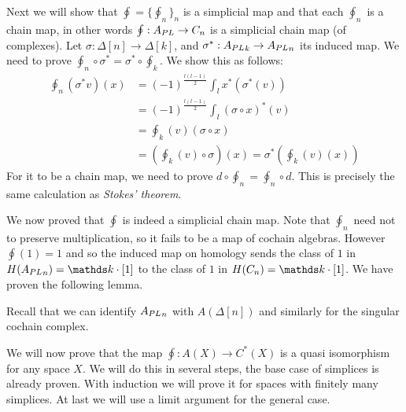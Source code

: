 Next we will show that $\oint = \{\oint_n\}_n$ is a simplicial map and that each $\oint_n$ is a chain map, in other words $\oint : {A_{PL}} \to C_n$ is a simplicial chain map (of complexes). Let $\sigma: \Delta[n] \to \Delta[k]$, and $\sigma^\ast: {A_{PL}}_k \to {A_{PL}}_n$ its induced map. We need to prove $\oint_n \circ \sigma^\ast = \sigma^\ast \circ \oint_k$. We show this as follows:
\begin{align*}
	\oint_n (\sigma^\ast v)(x)
	&= (-1)^\frac{l(l-1)}{2} \int_l x^\ast(\sigma^\ast(v)) \\
	&= (-1)^\frac{l(l-1)}{2} \int_l (\sigma \circ x)^\ast(v) \\
	&= \oint_k (v)(\sigma \circ x) \\
	&= (\oint_k (v) \circ \sigma) (x) = \sigma^\ast (\oint_k(v)(x))
\end{align*}
For it to be a chain map, we need to prove $d \circ \oint_n = \oint_n \circ d$. This is precisely the same calculation as \emph{Stokes' theorem}. 

We now proved that $\oint$ is indeed a simplicial chain map. Note that $\oint_n$ need not to preserve multiplication, so it fails to be a map of cochain algebras. However $\oint(1) = 1$ and so the induced map on homology sends the class of $1$ in $H(\Apl_n) = \k \cdot [1]$ to the class of $1$ in $H(C_n) = \k \cdot [1]$. We have proven the following lemma.


Recall that we can identify ${A_{PL}}_n$ with $A(\Delta[n])$ and similarly for the singular cochain complex.

We will now prove that the map $\oint: A(X) \to C^\ast(X)$ is a quasi isomorphism for any space $X$. We will do this in several steps, the base case of simplices is already proven. With induction we will prove it for spaces with finitely many simplices. At last we will use a limit argument for the general case.

